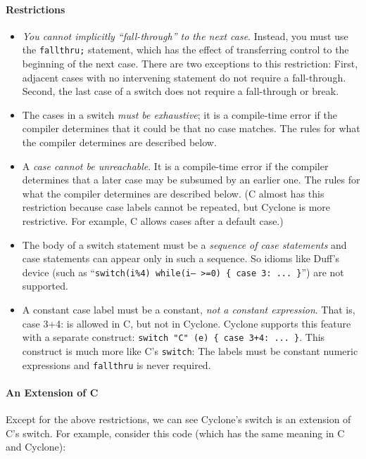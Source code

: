 \paragraph{Restrictions}
\begin{itemize}
\item \emph{You cannot implicitly ``fall-through'' to the next case}.
  Instead, you must use the \texttt{fallthru;} statement, which has
  the effect of transferring control to the beginning of the next
  case.  There are two exceptions to this restriction:  First, adjacent
  cases with no intervening statement do not require a fall-through.
  Second, the last case of a switch does not require a fall-through
  or break.
\item The cases in a switch \emph{must be exhaustive}; it is a
  compile-time error if the compiler determines that it could be that
  no case matches.  The rules for what the compiler determines are
  described below.
\item A \emph{case cannot be unreachable}.  It is a compile-time error
  if the compiler determines that a later case may be subsumed by an
  earlier one.  The rules for what the compiler determines are
  described below.  (C almost has this restriction because case labels
  cannot be repeated, but Cyclone is more restrictive.  For example, C
  allows cases after a default case.)
\item The body of a switch statement must be a \emph{sequence of case
    statements} and case statements can appear only in such a
  sequence. So idioms like Duff's device
  (such as ``\texttt{switch(i\%4) while(i-- >=0) \{ case 3: ... \}}'')
  are not supported.
\item A constant case label must be a constant, \emph{not a constant
    expression}.  That is, case 3+4: is allowed in C, but not in
  Cyclone.  Cyclone supports this feature with a separate construct:
  \texttt{switch "C" (e) \{ case 3+4: ... \}}.  This construct is much
  more like C's \texttt{switch}: The labels must be constant
  numeric expressions and \texttt{fallthru} is never required.
\end{itemize}

\paragraph{An Extension of C}

Except for the above restrictions, we can see Cyclone's switch is an
extension of C's switch.  For example, consider this code (which has
the same meaning in C and Cyclone):

